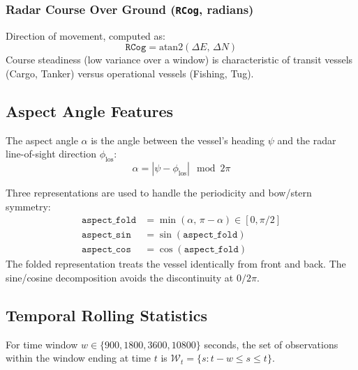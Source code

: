 \documentclass[journal]{IEEEtran}
\begin{document}
\subsubsection{Radar Course Over Ground (\texttt{RCog}, radians)}

Direction of movement, computed as:
\begin{equation}
  \texttt{RCog} = \text{atan2}(\Delta E,\, \Delta N)
\end{equation}
Course steadiness (low variance over a window) is characteristic of transit
vessels (Cargo, Tanker) versus operational vessels (Fishing, Tug).

\subsection{Aspect Angle Features}

The aspect angle $\alpha$ is the angle between the vessel's heading $\psi$
and the radar line-of-sight direction $\phi_{\text{los}}$:
\begin{equation}
  \alpha = |\psi - \phi_{\text{los}}| \mod 2\pi
\end{equation}

Three representations are used to handle the periodicity and bow/stern symmetry:
\begin{align}
  \texttt{aspect\_fold}  &= \min(\alpha,\, \pi - \alpha) \in [0, \pi/2] \\
  \texttt{aspect\_sin}   &= \sin(\texttt{aspect\_fold}) \\
  \texttt{aspect\_cos}   &= \cos(\texttt{aspect\_fold})
\end{align}
The folded representation treats the vessel identically from front and back.
The sine/cosine decomposition avoids the discontinuity at $0/2\pi$.

\subsection{Temporal Rolling Statistics}

For time window $w \in \{900, 1800, 3600, 10800\}$ seconds, the set of
observations within the window ending at time $t$ is
$\mathcal{W}_t = \{s : t-w \leq s \leq t\}$.
\end{document}
